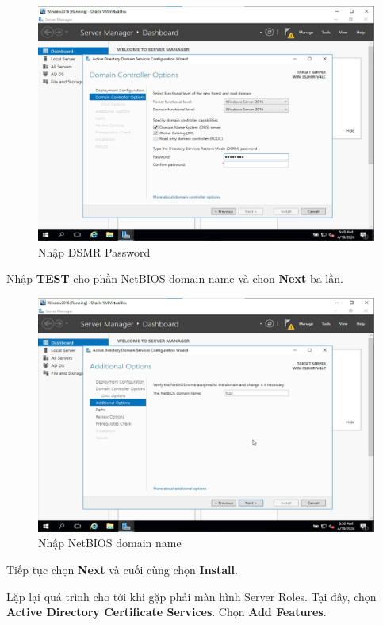 \begin{figure}[!htb]
    \centering
    \includegraphics[width=0.9\linewidth]{figure//chapter4//lab4_1/enter_password_2.png}
    \caption{Nhập DSMR Password}
    \label{fig:enter-label}
\end{figure}

 Nhập \textbf{TEST} cho phần NetBIOS domain name và chọn \textbf{Next} ba lần.

\begin{figure}[!htb]
    \centering
    \includegraphics[width=0.9\linewidth]{figure//chapter4//lab4_1/enter_netbios_domain_name.png}
    \caption{Nhập NetBIOS domain name}
    \label{fig:enter-label}
\end{figure}

\noindent Tiếp tục chọn \textbf{Next} và cuối cùng chọn \textbf{Install}.

 Lặp lại quá trình cho tới khi gặp phải màn hình Server Roles. Tại đây, chọn \textbf{Active Directory Certificate Services}. Chọn \textbf{Add Features}.

